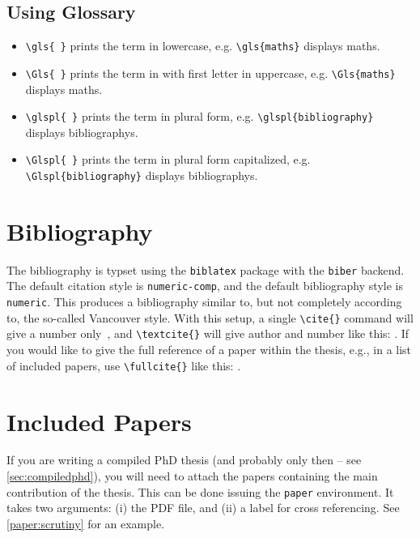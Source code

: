 \subsection{Using Glossary}
\begin{itemize}
  \item \texttt{\textbackslash gls\{ \}} prints the term in lowercase, e.g. \texttt{\textbackslash gls\{maths\}} displays \gls{maths}.
  \item \texttt{\textbackslash Gls\{ \}} prints the term in with first letter in uppercase, e.g. \texttt{\textbackslash Gls\{maths\}} displays \Gls{maths}.
  \item \texttt{\textbackslash glspl\{ \}} prints the term in plural form, e.g. \texttt{\textbackslash glspl\{bibliography\}} displays \glspl{bibliography}.
  \item \texttt{\textbackslash Glspl\{ \}} prints the term in plural form capitalized, e.g. \texttt{\textbackslash Glspl\{bibliography\}} displays \Glspl{bibliography}.
\end{itemize}


\section{Bibliography}

The \gls{bibliography} is typset using the \texttt{biblatex} package with the \texttt{biber} backend. The default citation style is \texttt{numeric-comp}, and the default bibliography style is \texttt{numeric}. This produces a bibliography similar to, but not completely according to, the so-called Vancouver style. With this setup, a single \texttt{\textbackslash cite\{\}} command will give a number only~\cite{landes1951scrutiny}, and \texttt{\textbackslash textcite\{\}} will give author and number like this: \textcite{landes1951scrutiny}. If you would like to give the full reference of a paper within the thesis, e.g., in a list of included papers, use \texttt{\textbackslash fullcite\{\}} like this: .

\section{Included Papers}

If you are writing a compiled PhD thesis (and probably only then – see \cref{sec:compiledphd}), you will need to attach the papers containing the main contribution of the thesis. This can be done issuing the \texttt{paper} environment. It takes two arguments: (i) the PDF file, and (ii) a label for cross referencing. See \cref{paper:scrutiny} for an example.

